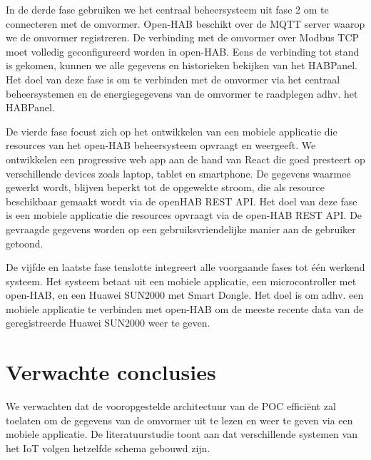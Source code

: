 \documentclass{hogent-article}
\begin{document}
    In de derde fase gebruiken we het centraal beheersysteem uit fase 2 om te connecteren met de omvormer. Open-HAB beschikt over de MQTT server waarop we de omvormer registreren. De verbinding met de omvormer over Modbus TCP moet volledig geconfigureerd worden in open-HAB. Eens de verbinding tot stand is gekomen, kunnen we alle gegevens en historieken bekijken van het HABPanel. Het doel van deze fase is om te verbinden met de omvormer via het centraal beheersystemen en de energiegegevens van de omvormer te raadplegen adhv. het HABPanel.
    
    De vierde fase focust zich op het ontwikkelen van een mobiele applicatie die resources van het open-HAB beheersysteem opvraagt en weergeeft. We ontwikkelen een progressive web app aan de hand van React die goed presteert op verschillende devices zoals laptop, tablet en smartphone. De gegevens waarmee gewerkt wordt, blijven beperkt tot de opgewekte stroom, die als resource beschikbaar gemaakt wordt via de openHAB REST API. Het doel van deze fase is een mobiele applicatie die resources opvraagt via de open-HAB REST API. De gevraagde gegevens worden op een gebruiksvriendelijke manier aan de gebruiker getoond.
    
    De vijfde en laatste fase tenslotte integreert alle voorgaande fases tot één werkend systeem. Het systeem betaat uit een mobiele applicatie, een microcontroller met open-HAB, en een Huawei SUN2000 met Smart Dongle. Het doel is om adhv. een mobiele applicatie te verbinden met open-HAB om de meeste recente data van de geregistreerde Huawei SUN2000 weer te geven.
    
    \section{Verwachte conclusies}
    
    
    We verwachten dat de vooropgestelde architectuur van de POC efficiënt zal toelaten om de gegevens van de omvormer uit te lezen en weer te geven via een mobiele applicatie. De literatuurstudie toont aan dat verschillende systemen van het IoT volgen hetzelfde schema gebouwd zijn.
    
\end{document}
